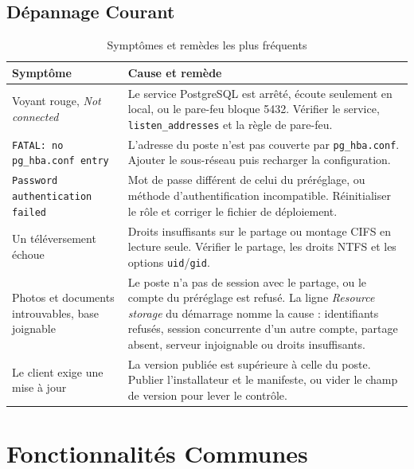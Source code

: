 \subsection{Dépannage Courant}
\begin{table}[H]
\centering
\caption{Symptômes et remèdes les plus fréquents}
\label{tab:depannage}
\begin{tabularx}{\textwidth}{p{6.2cm} X}
\toprule
\textbf{Symptôme} & \textbf{Cause et remède} \\
\midrule
Voyant rouge, \emph{Not connected} & Le service PostgreSQL est arrêté, écoute seulement en local, ou le
pare-feu bloque 5432. Vérifier le service, \texttt{listen\_addresses} et la règle de pare-feu. \\
\texttt{FATAL: no pg\_hba.conf entry} & L'adresse du poste n'est pas couverte par \texttt{pg\_hba.conf}.
Ajouter le sous-réseau puis recharger la configuration. \\
\texttt{Password authentication failed} & Mot de passe différent de celui du préréglage, ou méthode
d'authentification incompatible. Réinitialiser le rôle et corriger le fichier de déploiement. \\
Un téléversement échoue & Droits insuffisants sur le partage ou montage CIFS en lecture seule. Vérifier
le partage, les droits NTFS et les options \texttt{uid}/\texttt{gid}. \\
Photos et documents introuvables, base joignable & Le poste n'a pas de session avec le partage, ou le
compte du préréglage est refusé. La ligne \emph{Resource storage} du démarrage nomme la cause :
identifiants refusés, session concurrente d'un autre compte, partage absent, serveur injoignable ou
droits insuffisants. \\
Le client exige une mise à jour & La version publiée est supérieure à celle du poste. Publier
l'installateur et le manifeste, ou vider le champ de version pour lever le contrôle. \\
\bottomrule
\end{tabularx}
\end{table}

\section{Fonctionnalités Communes}
